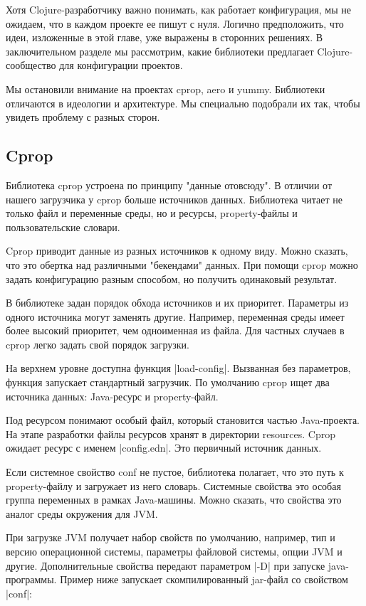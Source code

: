 Хотя Clojure-разработчику важно понимать, как работает конфигурация, мы не
ожидаем, что в каждом проекте ее пишут с нуля. Логично предположить, что идеи,
изложенные в этой главе, уже выражены в сторонних решениях. В заключительном
разделе мы рассмотрим, какие библиотеки предлагает Clojure-сообщество для
конфигурации проектов.

Мы остановили внимание на проектах cprop, aero и yummy. Библиотеки отличаются в
идеологии и архитектуре. Мы специально подобрали их так, чтобы увидеть проблему
с разных сторон.

\subsection{Cprop}

Библиотека cprop устроена по принципу "данные отовсюду". В отличии от нашего
загрузчика у cprop больше источников данных. Библиотека читает не только файл и
переменные среды, но и ресурсы, property-файлы и пользовательские словари.

Cprop приводит данные из разных источников к одному виду. Можно сказать, что это
обертка над различными "бекендами" данных. При помощи cprop можно задать
конфигурацию разным способом, но получить одинаковый результат.

В библиотеке задан порядок обхода источников и их приоритет. Параметры из одного
источника могут заменять другие. Например, переменная среды имеет более высокий
приоритет, чем одноименная из файла. Для частных случаев в cprop легко задать
свой порядок загрузки.

На верхнем уровне доступна функция \spverb|load-config|. Вызванная без параметров,
функция запускает стандартный загрузчик. По умолчанию cprop ищет два источника
данных: Java-ресурс и property-файл.

Под ресурсом понимают особый файл, который становится частью Java-проекта. На
этапе разработки файлы ресурсов хранят в директории resources. Cprop ожидает
ресурс с именем \spverb|config.edn|. Это первичный источник данных.

Если системное свойство conf не пустое, библиотека полагает, что это путь к
property-файлу и загружает из него словарь. Системные свойства это особая группа
переменных в рамках Java-машины. Можно сказать, что свойства это аналог среды
окружения для JVM.

При загрузке JVM получает набор свойств по умолчанию, например, тип и версию
операционной системы, параметры файловой системы, опции JVM и
другие. Дополнительные свойства передают параметром \spverb|-D| при запуске
java-программы. Пример ниже запускает скомпилированный jar-файл со свойством
\spverb|conf|:

